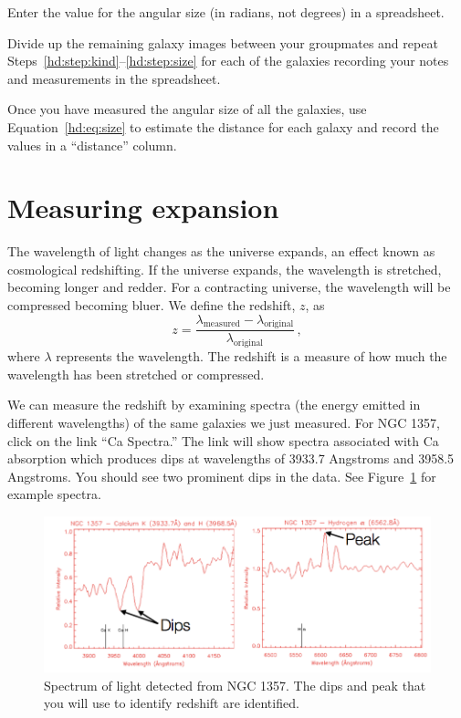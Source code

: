 \begin{steps}
	\item\label{hd:step:size} Enter the value for the angular size
(in radians, not degrees) in a spreadsheet.

	\item Divide up the remaining galaxy images between your groupmates
	and repeat Steps~\ref{hd:step:kind}--\ref{hd:step:size} for each of the galaxies recording your notes
	and measurements in the spreadsheet.
	
	\item Once you have measured the angular size of all the galaxies, use Equation~\ref{hd:eq:size} to estimate the distance for each galaxy
	and record the values in a “distance” column.
\end{steps}





\section{Measuring expansion}

The wavelength of light changes as the universe expands, an effect
known as cosmological redshifting. If the universe expands, the
wavelength is stretched, becoming longer and redder. For a contracting
universe, the wavelength will be compressed becoming bluer. We define
the redshift, $z$, as
\begin{equation}\label{hd:eq:redshift}
 z = \frac{\lambda_\textrm{measured} - \lambda_\textrm{original}}{\lambda_\textrm{original}} \,,
\end{equation}
where $\lambda$ represents the wavelength. The redshift is a measure of how much the wavelength has been
stretched or compressed.

We can measure the redshift by examining spectra (the energy emitted
in different wavelengths) of the same galaxies we just measured. For
NGC 1357, click on the link “Ca Spectra.” The link will show spectra
associated with Ca absorption which produces dips at wavelengths of
3933.7 Angstroms and 3958.5 Angstroms. You should see two
prominent dips in the data. See Figure~\ref{hd:fig:spectra} for example spectra.

\begin{figure}
	\centering
	\includegraphics[width=\textwidth]{hubble-diagram/spectra}
	\caption{Spectrum of light detected from NGC 1357. The dips and peak that you will use to identify redshift are identified.}\label{hd:fig:spectra}
\end{figure}

